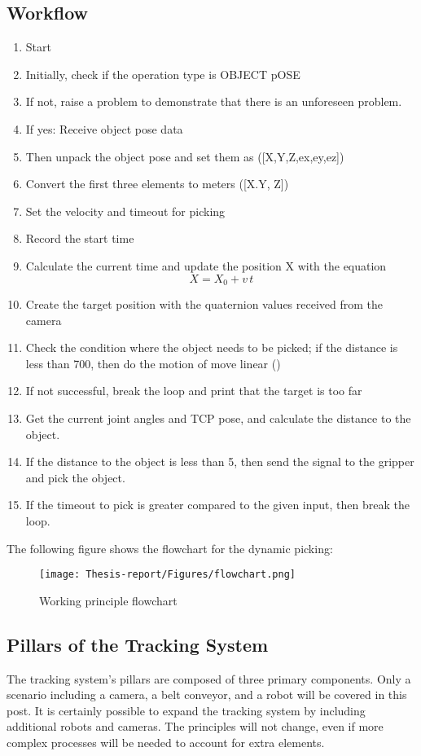 \documentclass[12pt]{article}
\begin{document}
\subsection{Workflow}
\begin{enumerate}
    \item Start
    \item Initially, check if the operation type is OBJECT pOSE
    \item If not, raise a problem to demonstrate that there is an unforeseen problem.
    \item If yes: Receive object pose data
    \item Then unpack the object pose and set them as ([X,Y,Z,ex,ey,ez])
    \item Convert the first three elements to meters ([X.Y, Z])
    \item Set the velocity and timeout for picking
    \item Record the start time
    \item Calculate the current time and update the position X with the equation \[  
X = X_0 + v\,t
\]

    \item Create the target position with the quaternion values received from the camera
    \item Check the condition where the object needs to be picked; if the distance is less than 700, then do the motion of move linear ()
    \item If not successful,  break the loop and print that the target is too far
    \item Get the current joint angles and TCP pose, and calculate the distance to the object.
    \item If the distance to the object is less than 5, then send the signal to the gripper and pick the object.
    \item If the timeout to pick is greater compared to the given input, then break the loop.
\end{enumerate}
\newpage
The following figure shows the flowchart for the dynamic picking:\\
\begin{figure}[h]
    \centering
    \texttt{[image: Thesis-report/Figures/flowchart.png]}  
    \caption{Working principle flowchart}
    \label{fig:working-principle}
\end{figure}
\newpage

\newpage

\subsection{Pillars of the Tracking System}
The tracking system's pillars are composed of three primary components. Only a scenario including a camera, a belt conveyor, and a robot will be covered in this post. It is certainly possible to expand the tracking system by including additional robots and cameras. The principles will not change, even if more complex processes will be needed to account for extra elements\cite{ref25}.\\
\end{document}
